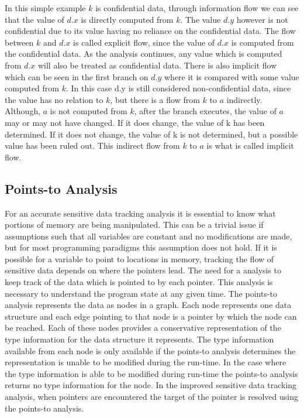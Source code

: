 \documentclass[11pt,a4paper]{article}
\begin{document}
  In this simple example $k$ is confidential data, through information flow we
  can see that the value of $d.x$ is directly computed from $k$. The value $d.y$
  however is not confidential due to its value having no reliance on the
  confidential data. The flow between $k$ and $d.x$ is called explicit flow,
  since the value of $d.x$ is computed from the confidential data. As the
  analysis continues, any value which is computed from $d.x$ will also be
  treated as confidential data. There is also implicit flow which can be seen in
  the first branch on $d.y$ where it is compared with some value computed from
  $k$. In this case d.y is still considered non-confidential data, since the
  value has no relation to $k$, but there is a flow from $k$ to $a$ indirectly.
  Although, $a$ is not computed from $k$, after the branch executes, the value
  of $a$ may or may not have changed. If it does change, the value of k has been
  determined. If it does not change, the value of k is not determined, but a
  possible value has been ruled out. This indirect flow from $k$ to $a$ is what
  is called implicit flow.
\subsection{Points-to Analysis}

For an accurate sensitive data tracking analysis it is essential to know what
portions of memory are being manipulated. This can be a trivial issue if
assumptions such that all variables are constant and no modifications are made,
but for most programming paradigms this assumption does not hold. If it is
possible for a variable to point to locations in memory, tracking the flow of
sensitive data depends on where the pointers lead. The need for a analysis to
keep track of the data which is pointed to by each pointer. This analysis is
necessary to understand the program state at any given time. The points-to
analysis represents the data as nodes in a graph. Each node represents one data
structure and each edge pointing to that node is a pointer by which the node can
be reached. Each of these nodes provides a conservative representation of the
type information for the data structure it represents. The type information
available from each node is only available if the points-to analysis determines
the representation is unable to be modified during the run-time. In the case
where the type information is able to be modified during run-time the points-to
analysis returns no type information for the node. In the improved sensitive
data tracking analysis, when pointers are encountered the target of the pointer
is resolved using the points-to analysis.
\end{document}
